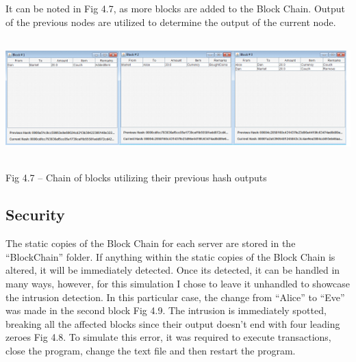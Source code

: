 \documentclass{article} %
\begin{document}
\begin{flushleft}
It can be noted in Fig 4.7, as more blocks are added to the Block Chain. Output of the previous nodes are utilized to determine the output of the current node. 
\end{flushleft}

\noindent \begin{center}
\includegraphics*[bb=0 0 6.54in 1.83in, width=6.54in, height=1.83in, keepaspectratio=false]{image7.png}

\noindent Fig 4.7 -- Chain of blocks utilizing their previous hash outputs
\end{center}

\noindent \begin{flushleft}

\end{flushleft}

\noindent 
\subsection{Security}

\begin{flushleft}
The static copies of the Block Chain for each server are stored in the ``BlockChain'' folder. If anything within the static copies of the Block Chain is altered, it will be immediately detected. Once its detected, it can be handled in many ways, however, for this simulation I chose to leave it unhandled to showcase the intrusion detection. In this particular case, the change from ``Alice'' to ``Eve'' was made in the second block Fig 4.9. The intrusion is immediately spotted, breaking all the affected blocks since their output doesn't end with four leading zeroes Fig 4.8. To simulate this error, it was required to execute transactions, close the program, change the text file and then restart the program.
\end{flushleft}
\end{document}
